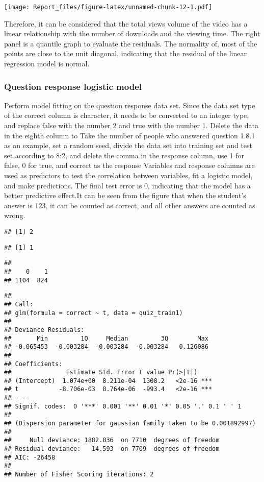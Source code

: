 \documentclass[
]{article}
\begin{document}
\texttt{[image: Report\_files/figure-latex/unnamed-chunk-12-1.pdf]}

Therefore, it can be considered that the total views volume of the video
has a linear relationship with the number of downloads and the viewing
time. The right panel is a quantile graph to evaluate the residuals. The
normality of, most of the points are close to the unit diagonal,
indicating that the residual of the linear regression model is normal.

\hypertarget{question-response-logistic-model}{%
\subsubsection{Question response logistic
model}\label{question-response-logistic-model}}

Perform model fitting on the question response data set. Since the data
set type of the correct column is character, it needs to be converted to
an integer type, and replace false with the number 2 and true with the
number 1. Delete the data in the eighth column to Take the number of
people who answered question 1.8.1 as an example, set a random seed,
divide the data set into training set and test set according to 8:2, and
delete the comma in the response column, use 1 for false, 0 for true,
and correct as the response Variables and response columns are used as
predictors to test the correlation between variables, fit a logistic
model, and make predictions. The final test error is 0, indicating that
the model has a better predictive effect.It can be seen from the figure
that when the student's answer is 123, it can be counted as correct, and
all other answers are counted as wrong.

\begin{verbatim}
## [1] 2
\end{verbatim}

\begin{verbatim}
## [1] 1
\end{verbatim}

\begin{verbatim}
## 
##    0    1 
## 1104  824
\end{verbatim}

\begin{verbatim}
## 
## Call:
## glm(formula = correct ~ t, data = quiz_train1)
## 
## Deviance Residuals: 
##       Min         1Q     Median         3Q        Max  
## -0.065453  -0.003284  -0.003284  -0.003284   0.126086  
## 
## Coefficients:
##               Estimate Std. Error t value Pr(>|t|)    
## (Intercept)  1.074e+00  8.211e-04  1308.2   <2e-16 ***
## t           -8.706e-03  8.764e-06  -993.4   <2e-16 ***
## ---
## Signif. codes:  0 '***' 0.001 '**' 0.01 '*' 0.05 '.' 0.1 ' ' 1
## 
## (Dispersion parameter for gaussian family taken to be 0.001892997)
## 
##     Null deviance: 1882.836  on 7710  degrees of freedom
## Residual deviance:   14.593  on 7709  degrees of freedom
## AIC: -26458
## 
## Number of Fisher Scoring iterations: 2
\end{verbatim}
\end{document}
